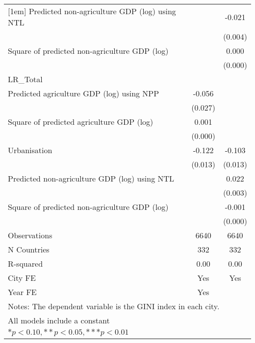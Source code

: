 {\begin{tabular}{l*{2}{c}}
[1em]
Predicted non-agriculture GDP (log) using NTL&                     &      -0.021\sym{***}\\
                    &                     &     (0.004)         \\
[1em]
Square of predicted non-agriculture GDP (log)&                     &       0.000\sym{**} \\
                    &                     &     (0.000)         \\
\hline
LR\_Total            &                     &                     \\
Predicted agriculture GDP (log) using NPP&      -0.056\sym{**} &                     \\
                    &     (0.027)         &                     \\
[1em]
Square of predicted agriculture GDP (log)&       0.001         &                     \\
                    &     (0.000)         &                     \\
[1em]
Urbanisation        &      -0.122\sym{***}&      -0.103\sym{***}\\
                    &     (0.013)         &     (0.013)         \\
[1em]
Predicted non-agriculture GDP (log) using NTL&                     &       0.022\sym{***}\\
                    &                     &     (0.003)         \\
[1em]
Square of predicted non-agriculture GDP (log)&                     &      -0.001\sym{***}\\
                    &                     &     (0.000)         \\
\hline
Observations        &        6640         &        6640         \\
N Countries         &         332         &         332         \\
R-squared           &        0.00         &        0.00         \\
City FE             &         Yes         &         Yes         \\
Year FE             &         Yes         &                     \\
\hline\hline
\multicolumn{3}{l}{\footnotesize Notes: The dependent variable is the GINI index in each city.}\\
\multicolumn{3}{l}{\footnotesize All models include a constant}\\
\multicolumn{3}{l}{\footnotesize $* p<0.10, ** p<0.05, *** p<0.01$}\\
\end{tabular}
}
